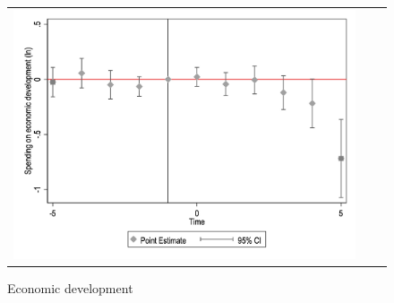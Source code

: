 \begin{figure}[!ht]
\begin{tabular}{@{}ccc@{}}
\begin{minipage}[t]{0.32\textwidth}
            \caption{Economic development}
            \includegraphics[width=\linewidth]{images/pop_10000/caseventdd_ln_q4_11_step1.jpg}
            \label{fig:casecodev}
        \end{minipage} \\[10pt]


\end{tabular}
\end{figure}
